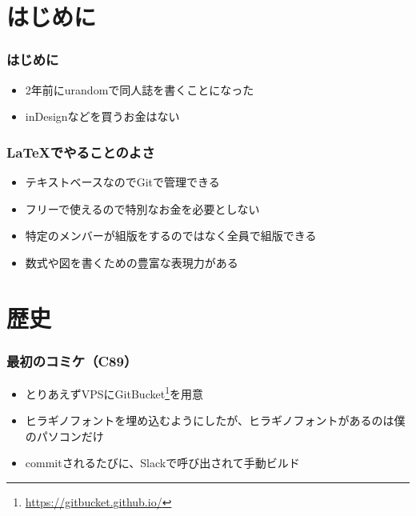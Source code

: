 \section{はじめに}

\begin{frame}
  \frametitle{はじめに}

  \begin{itemize}
    \item<2-> 2年前にurandomで同人誌を書くことになった
    \item<3-> inDesignなどを買うお金はない
  \end{itemize}

  \begin{center}
  \end{center} 
\end{frame}

\begin{frame}
  \frametitle{\LaTeX でやることのよさ}

  \begin{itemize}
    \item<2-> テキストベースなのでGitで管理できる
    \item<3-> フリーで使えるので特別なお金を必要としない
    \item<4-> 特定のメンバーが組版をするのではなく全員で組版できる
    \item<5-> 数式や図を書くための豊富な表現力がある
  \end{itemize}
\end{frame}

\section{歴史}

\begin{frame}
  \frametitle{最初のコミケ（C89）}

  \begin{itemize}
    \item<2-> とりあえずVPSにGitBucket\footnote[frame]{\url{https://gitbucket.github.io/}}を用意
    \item<3-> ヒラギノフォントを埋め込むようにしたが、ヒラギノフォントがあるのは僕のパソコンだけ
    \item<4-> commitされるたびに、Slackで呼び出されて手動ビルド
  \end{itemize}

  \begin{center}
  \end{center}
\end{frame}

